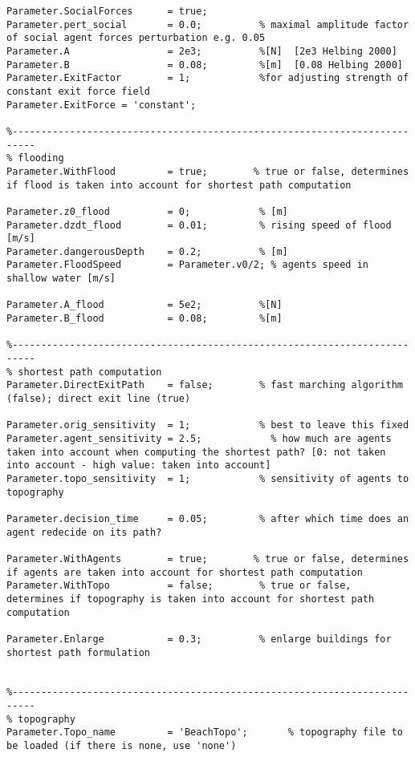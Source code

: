 \begin{lstlisting}[breaklines]
% social force parameters
Parameter.SocialForces      = true;
Parameter.pert_social       = 0.0;          % maximal amplitude factor of social agent forces perturbation e.g. 0.05
Parameter.A                 = 2e3;          %[N]  [2e3 Helbing 2000]
Parameter.B                 = 0.08;         %[m]  [0.08 Helbing 2000]
Parameter.ExitFactor        = 1;            %for adjusting strength of constant exit force field
Parameter.ExitForce = 'constant';

%--------------------------------------------------------------------------
% flooding
Parameter.WithFlood         = true;        % true or false, determines if flood is taken into account for shortest path computation

Parameter.z0_flood          = 0;            % [m]
Parameter.dzdt_flood        = 0.01;         % rising speed of flood [m/s]
Parameter.dangerousDepth    = 0.2;          % [m]
Parameter.FloodSpeed        = Parameter.v0/2; % agents speed in shallow water [m/s]

Parameter.A_flood           = 5e2;          %[N]
Parameter.B_flood           = 0.08;         %[m]

%--------------------------------------------------------------------------
% shortest path computation
Parameter.DirectExitPath    = false;     	% fast marching algorithm (false); direct exit line (true)

Parameter.orig_sensitivity	= 1;            % best to leave this fixed
Parameter.agent_sensitivity	= 2.5;            % how much are agents taken into account when computing the shortest path? [0: not taken into account - high value: taken into account]
Parameter.topo_sensitivity 	= 1;            % sensitivity of agents to topography

Parameter.decision_time   	= 0.05;         % after which time does an agent redecide on its path?

Parameter.WithAgents        = true;        % true or false, determines if agents are taken into account for shortest path computation
Parameter.WithTopo          = false;        % true or false, determines if topography is taken into account for shortest path computation

Parameter.Enlarge           = 0.3;          % enlarge buildings for shortest path formulation


%--------------------------------------------------------------------------
% topography
Parameter.Topo_name         = 'BeachTopo';       % topography file to be loaded (if there is none, use 'none')


\end{lstlisting}
